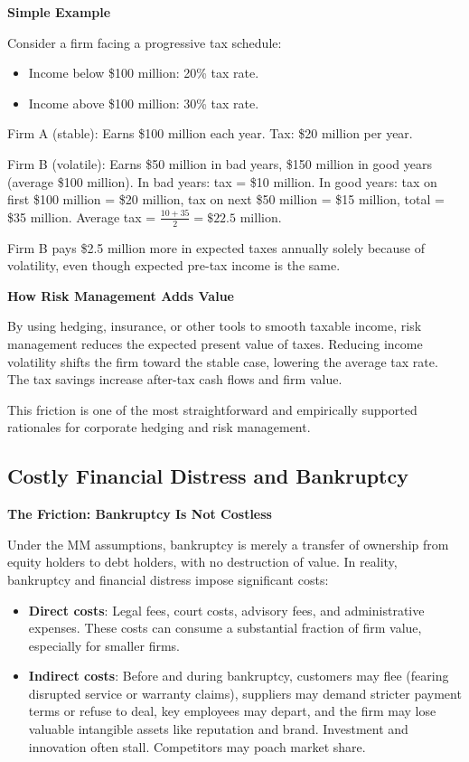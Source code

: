 \documentclass[11pt,openany]{book}
\providecommand{\tightlist}{\setlength{\itemsep}{0pt}\setlength{\parskip}{0pt}}
\begin{document}
\textbf{Simple Example}

Consider a firm facing a progressive tax schedule:

\begin{itemize}
\tightlist
\item
  Income below \$100 million: 20\% tax rate.
\item
  Income above \$100 million: 30\% tax rate.
\end{itemize}

Firm A (stable): Earns \$100 million each year. Tax: \$20 million per year.

Firm B (volatile): Earns \$50 million in bad years, \$150 million in good years (average \$100 million). In bad years: tax = \$10 million. In good years: tax on first \$100 million = \$20 million, tax on next \$50 million = \$15 million, total = \$35 million. Average tax = \(\frac{10 + 35}{2} = \$22.5\) million.

Firm B pays \$2.5 million more in expected taxes annually solely because of volatility, even though expected pre-tax income is the same.

\textbf{How Risk Management Adds Value}

By using hedging, insurance, or other tools to smooth taxable income, risk management reduces the expected present value of taxes. Reducing income volatility shifts the firm toward the stable case, lowering the average tax rate. The tax savings increase after-tax cash flows and firm value.

This friction is one of the most straightforward and empirically supported rationales for corporate hedging and risk management.

\subsection{Costly Financial Distress and Bankruptcy}\label{costly-financial-distress-and-bankruptcy}

\textbf{The Friction: Bankruptcy Is Not Costless}

Under the MM assumptions, bankruptcy is merely a transfer of ownership from equity holders to debt holders, with no destruction of value. In reality, bankruptcy and financial distress impose significant costs:

\begin{itemize}
\tightlist
\item
  \textbf{Direct costs}: Legal fees, court costs, advisory fees, and administrative expenses. These costs can consume a substantial fraction of firm value, especially for smaller firms.
\item
  \textbf{Indirect costs}: Before and during bankruptcy, customers may flee (fearing disrupted service or warranty claims), suppliers may demand stricter payment terms or refuse to deal, key employees may depart, and the firm may lose valuable intangible assets like reputation and brand. Investment and innovation often stall. Competitors may poach market share.
\end{itemize}
\end{document}
